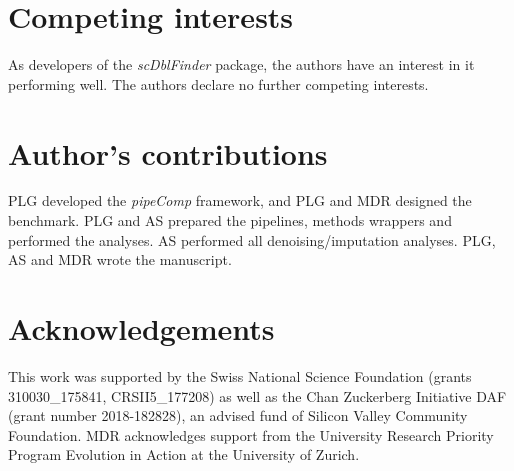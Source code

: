\documentclass{bmcart}
\begin{document}
\begin{backmatter}

\section*{Competing interests}
As developers of the \textit{scDblFinder} package, the authors have an interest in it performing well. The authors declare no further competing interests.

\section*{Author's contributions}
PLG developed the \textit{pipeComp} framework, and PLG and MDR designed the benchmark. PLG and AS prepared the pipelines, methods wrappers and performed the analyses. AS performed all denoising/imputation analyses. PLG, AS and MDR wrote the manuscript.

\section*{Acknowledgements}
This work was supported by the Swiss National Science Foundation (grants 310030\_175841, CRSII5\_177208) as well as the Chan Zuckerberg Initiative DAF (grant number 2018-182828), an advised fund of Silicon Valley Community Foundation. MDR acknowledges support from the University Research Priority Program Evolution in Action at the University of Zurich.




\end{backmatter}
\end{document}
